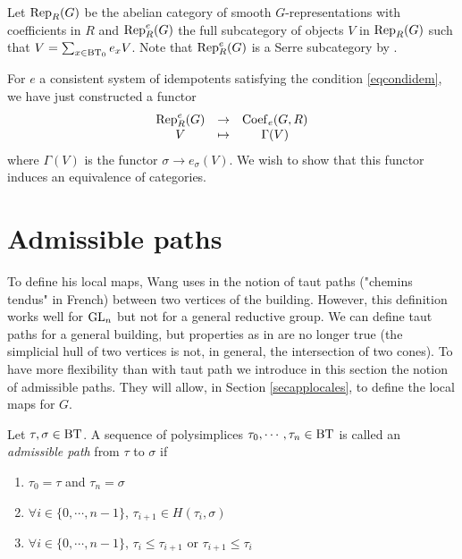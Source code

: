 \documentclass[a4paper,10pt]{amsart}
\begin{document}
\bigskip

Let $\rep[R]{G}$ be the abelian category of smooth $G$-representations with coefficients in $R$ and $\rep[R][e]{G}$ the full subcategory of objects $V$ in $\rep[R]{G}$ such that $V=\sum_{x\in \bts}e_{x}V$. Note that $\rep[R][e]{G}$ is a Serre subcategory by \cite[Thm 3.1]{meyer_resolutions_2010}.

\bigskip
For $e$ a consistent system of idempotents satisfying the condition \eqref{eqcondidem}, we have just constructed a functor
\[\begin{array}{ccc}
 \rep[R][e]{G} & \to & \coef \\
 V & \mapsto & \Gamma(V) \\
\end{array}\]
where $\Gamma(V)$ is the functor $\sigma \to e_{\sigma}(V)$. We wish to show that this functor induces an equivalence of categories.


\section{Admissible paths}

\label{secAdmpaths}


To define his local maps, Wang uses in \cite{Wanga} the notion of taut paths ("chemins tendus" in French) between two vertices of the building. However, this definition works well for $\gl{n}$ but not for a general reductive group. We can define taut paths for a general building, but properties as in \cite[Lem 2.2.5]{Wanga} are no longer true (the simplicial hull of two vertices is not, in general, the intersection of two cones). To have more flexibility than with taut path we introduce in this section the notion of admissible paths. They will allow, in Section \ref{secapplocales}, to define the local maps for $G$.

\begin{Def}
Let $\tau,\sigma \in \bt$. A sequence of polysimplices $\tau_{0},\cdots,\tau_{n} \in \bt$ is called an \textit{admissible path} from $\tau$ to $\sigma$ if
\begin{enumerate}
\item $\tau_{0}=\tau$ and $\tau_{n}=\sigma$
\item $\forall i \in \{0, \cdots, n-1\}$, $\tau_{i+1} \in H(\tau_{i},\sigma)$
\item $\forall i \in \{0, \cdots, n-1\}$, $\tau_{i} \leq \tau_{i+1}$ or $\tau_{i+1} \leq \tau_{i}$
\end{enumerate}
\end{Def}
\end{document}
